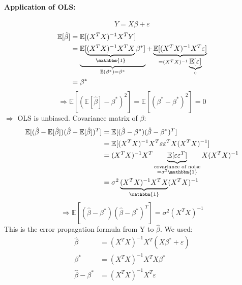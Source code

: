 \documentclass[11pt]{article}
\begin{document}
    \paragraph{Application of OLS:}
    \begin{equation*}
      Y=X\beta+\varepsilon
    \end{equation*}
    \begin{equation*}
      \begin{align*}
        \mathbb{E}[\hat{\beta}]&=\mathbb{E}[(X^TX)^{-1}X^TY] \\
        &= \underbrace{\mathbb{E}[\underbrace{(X^TX)^{-1}X^TX}_{\mathbbm{1}}\beta^*]}
        _{\mathbb{E}(\beta^*)=\beta^*}+\underbrace{\mathbb{E}[(X^TX)^{-1}X^T\varepsilon]}
        _{=(X^TX)^{-1}\underbrace{\mathbb{E}[\varepsilon]}_{0}} \\
        &= \beta^*
      \end{align*}
    \end{equation*}
    \begin{equation*}
      \Rightarrow \mathbb{E}[(\mathbb{E}[\hat{\beta}]-\beta^*)^2]=\mathbb{E}[(
      \beta^*-\beta^*)^2]=0
    \end{equation*}
    $\Rightarrow$ OLS is unbiased. Covariance matrix of $\beta$:
    \begin{equation*}
      \begin{align*}
        \mathbb{E}[(\hat{\beta}-\mathbb{E}[\hat{\beta}])(\hat{\beta}-\mathbb{E}
        [\hat{\beta}])^T] &= \mathbb{E}[(\hat{\beta}-\beta^*)(\hat{\beta}-\beta^*)^T] \\
        &= \mathbb{E}[(X^TX)^{-1}X^T\varepsilon \varepsilon^TX(X^TX)^{-1}] \\
        &= (X^TX)^{-1}X^T \underbrace{\mathbb{E}[\varepsilon \varepsilon^T]}_{\substack{\text
        {covariance of noise} \\ =\sigma^2 \mathbbm{1}}}X(X^TX)^{-1} \\
        &= \sigma^2 \underbrace{(X^TX)^{-1}X^TX}_{\mathbbm{1}}(X^TX)^{-1}
      \end{align*}
    \end{equation*}
    \begin{equation*}
      \Rightarrow \boxed{\mathbb{E}[(\hat{\beta}-\beta^*)(\hat{\beta}-\beta^*)^T]
      =\sigma^2(X^TX)^{-1}}
    \end{equation*}
    This is the error propagation formula from Y to $\hat{\beta}$. We used:
    \begin{equation*}
      \begin{align*}
        \hat{\beta} &=(X^TX)^{-1}X^T(X\beta^*+\varepsilon) \\
        \beta^* &= (X^TX)^{-1}X^TX\beta^* \\
        \hat{\beta}-\beta^* &= (X^TX)^{-1}X^T\varepsilon
      \end{align*}
    \end{equation*}
\end{document}
